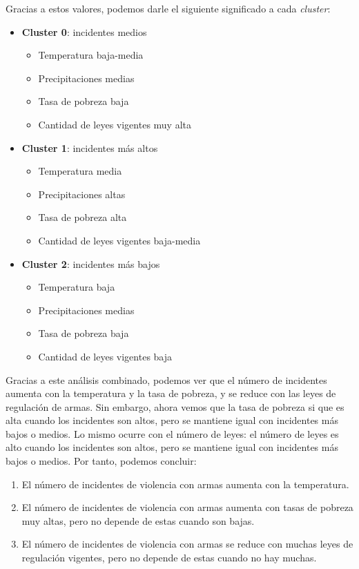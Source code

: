 \documentclass[11pt,a4paper]{article}
\begin{document}
Gracias a estos valores, podemos darle el siguiente significado a cada \textit{cluster}:

\begin{itemize}
    \item \textbf{Cluster 0}: incidentes medios
    \begin{itemize}
        \item Temperatura baja-media
        \item Precipitaciones medias
        \item Tasa de pobreza baja
        \item Cantidad de leyes vigentes muy alta
    \end{itemize}
    \item \textbf{Cluster 1}: incidentes más altos
    \begin{itemize}
        \item Temperatura media
        \item Precipitaciones altas
        \item Tasa de pobreza alta
        \item Cantidad de leyes vigentes baja-media
    \end{itemize}
    \item \textbf{Cluster 2}: incidentes más bajos
    \begin{itemize}
        \item Temperatura baja
        \item Precipitaciones medias
        \item Tasa de pobreza baja
        \item Cantidad de leyes vigentes baja
    \end{itemize}
\end{itemize}

Gracias a este análisis combinado, podemos ver que el número de incidentes aumenta con la temperatura y la tasa de pobreza, y se reduce con las leyes de regulación de armas. Sin embargo, ahora vemos que la tasa de pobreza si que es alta cuando los incidentes son altos, pero se mantiene igual con incidentes más bajos o medios. Lo mismo ocurre con el número de leyes: el número de leyes es alto cuando los incidentes son altos, pero se mantiene igual con incidentes más bajos o medios. Por tanto, podemos concluir:

\begin{enumerate}
    \item El número de incidentes de violencia con armas aumenta con la temperatura.
    \item El número de incidentes de violencia con armas aumenta con tasas de pobreza muy altas, pero no depende de estas cuando son bajas.
    \item El número de incidentes de violencia con armas se reduce con muchas leyes de regulación vigentes, pero no depende de estas cuando no hay muchas.
\end{enumerate}
\end{document}
